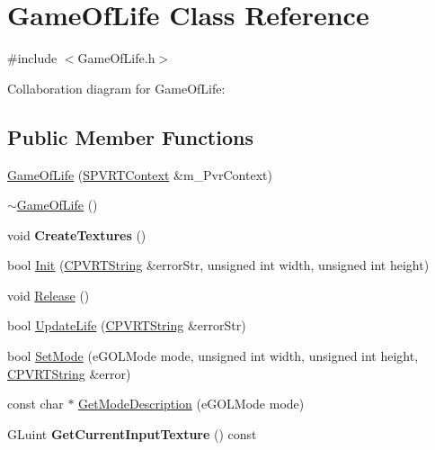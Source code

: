 \hypertarget{class_game_of_life}{\section{Game\+Of\+Life Class Reference}
\label{class_game_of_life}
}


{\ttfamily \#include $<$Game\+Of\+Life.\+h$>$}



Collaboration diagram for Game\+Of\+Life\+:
\subsection*{Public Member Functions}
\begin{DoxyCompactItemize}
\item 
\hyperlink{class_game_of_life_a1d9d1b4f8e3c935d74e57b4f8e3745b6}{Game\+Of\+Life} (\hyperlink{struct_s_p_v_r_t_context}{S\+P\+V\+R\+T\+Context} \&m\+\_\+\+Pvr\+Context)
\item 
\hyperlink{class_game_of_life_ab06a33fee5a200e5ef62e306aaaea9c7}{$\sim$\+Game\+Of\+Life} ()
\item 
\hypertarget{class_game_of_life_afeb53ca92b1d52a9035c205b222765c4}{void {\bfseries Create\+Textures} ()}\label{class_game_of_life_afeb53ca92b1d52a9035c205b222765c4}

\item 
bool \hyperlink{class_game_of_life_a239bb145b2356ecbfd3140c9fa712dfd}{Init} (\hyperlink{class_c_p_v_r_t_string}{C\+P\+V\+R\+T\+String} \&error\+Str, unsigned int width, unsigned int height)
\item 
void \hyperlink{class_game_of_life_a01044efbaf16b33038d42062d2d9ad5b}{Release} ()
\item 
bool \hyperlink{class_game_of_life_a0a3b92ce4503637ed8e60828c229a642}{Update\+Life} (\hyperlink{class_c_p_v_r_t_string}{C\+P\+V\+R\+T\+String} \&error\+Str)
\item 
bool \hyperlink{class_game_of_life_ac5c143c1f1dda4e697cee821b1356f92}{Set\+Mode} (e\+G\+O\+L\+Mode mode, unsigned int width, unsigned int height, \hyperlink{class_c_p_v_r_t_string}{C\+P\+V\+R\+T\+String} \&error)
\item 
const char $\ast$ \hyperlink{class_game_of_life_a86889ebeb55b6532289e7172b4f1e431}{Get\+Mode\+Description} (e\+G\+O\+L\+Mode mode)
\item 
\hypertarget{class_game_of_life_ac84c633bddc32c2742bc520106b4835c}{G\+Luint {\bfseries Get\+Current\+Input\+Texture} () const }\label{class_game_of_life_ac84c633bddc32c2742bc520106b4835c}


\end{DoxyCompactItemize}
